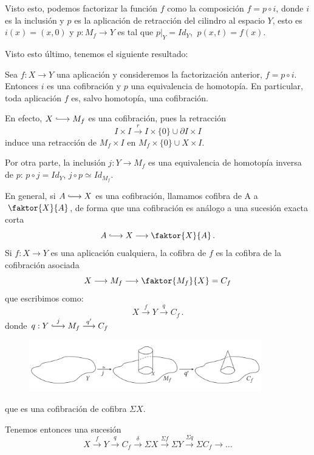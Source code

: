 Visto esto, podemos factorizar la función $f$ como la composición $f = p \circ i$, donde $i$ es la inclusión y $p$ es la aplicación de retracción del cilindro al espacio $Y$, esto es $i(x) = (x,0)$  y $p : M_f \longrightarrow Y$  es tal que $p \vert_Y = Id_Y$, $\ p(x,t) = f(x)$. \par 
Visto esto último, tenemos el siguiente resultado:
\newpage
\begin{teor}
Sea $f : X \longrightarrow Y$ una aplicación y consideremos la factorización anterior, $f = p \circ i$. Entonces $i$ es una cofibración y $p$ una equivalencia de homotopía. En particular, toda aplicación $f$ es, salvo homotopía, una cofibración. 
\end{teor}
\begin{demo}
En efecto, $X \longhookrightarrow M_f$ es una cofibración, pues la retracción 
\[
I \times I \stackrel{r}{\longrightarrow} I \times \{0\} \cup \partial I \times I
\]
induce una retracción de $M_f \times I$ en $M_f \times \{0\} \cup X \times  I$. \par 
Por otra parte, la inclusión $j : Y \longrightarrow M_f$ es una equivalencia de homotopía inversa de $p$: $p \circ j = Id_Y$, $j \circ p \simeq Id_{M_f}$.
\end{demo}
En general, si $A \longhookrightarrow X$ es una cofibración, llamamos cofibra de A a $\: \faktor{X}{A}$, de forma que una cofibración es análogo a una sucesión exacta corta
\[ A \longhookrightarrow X \longrightarrow \faktor{X}{A} \, .\]
Si $f : X \longrightarrow Y$ es una aplicación cualquiera, la cofibra de $f$ es la cofibra de la cofibración asociada
\[ X \longrightarrow M_f \longrightarrow \faktor{M_f}{X} = C_f \]
que escribimos como: 
\[ X \stackrel{f}{\longrightarrow} Y \stackrel{q}{\longrightarrow} C_f \, . \]
donde $q : Y \stackrel{j}{\longhookrightarrow} M_f \stackrel{q'}{\longrightarrow} C_f $\par 
\begin{figure}[h]
\centering
\includegraphics[width = 0.9\textwidth]{images/cilindycono}
\end{figure}
que es una cofibración de cofibra $\Sigma X$. \par
Tenemos entonces una sucesión
\[ X \stackrel{f}{\longrightarrow} Y \stackrel{q}{\longrightarrow} C_f \stackrel{\delta}{\longrightarrow} \Sigma X \stackrel{\Sigma f}{\longrightarrow} \Sigma Y \stackrel{\Sigma q}{\longrightarrow} \Sigma C_f \longrightarrow \dots \]
